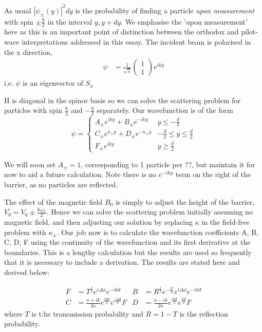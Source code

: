 \documentclass{article}
\begin{document}
As usual $|\psi_{\pm}(y)|^{2}dy$ is the probability of finding a particle \textit{upon measurement} with spin $\pm \frac{\hbar}{2}$ in the interval $y, y+dy$. We emphasise the 'upon measurement' here as this is an important point of distinction between the orthodox and pilot-wave interpretations addressed in this essay. The incident beam is polarised in the x direction,
\begin{align}
	\psi &= \frac{1}{\sqrt{2}}
	\begin{pmatrix}
	1\\
	1
	\end{pmatrix}
	e^{i k y}
\end{align}
i.e. $\psi$ is an eigenvector of $S_{x}$

H is diagonal in the spinor basis so we can solve the scattering problem for particles with spin $\frac{\hbar}{2}$ and $-\frac{\hbar}{2}$ separately. 
Our wavefunction is of the form
\begin{equation}
	\psi = 
	\begin{cases}
		A_{\pm}e^{i k y} + B_{\pm}e^{-i k y} & y \leq -\frac{d}{2} \\
		C_{\pm}e^{\kappa_{\pm}y} + D_{\pm}e^{-\kappa_{\pm}y} & -\frac{d}{2} \leq y \leq \frac{d}{2} \\
		F_{\pm}e^{i k y} & y \geq \frac{d}{2}
	\end{cases}
\end{equation}

We will soon set $A_{\pm} = 1$, corresponding to 1 particle per ??, but maintain it for now to aid a future calculation. Note there is no $e^{-i k y}$ term on the right of the barrier, as no particles are reflected. 

The effect of the magnetic field $B_0$ is simply to adjust the height of the barrier, $V_0^{'} = V_0 \pm \frac{\hbar \omega_L}{2}$. Hence we can solve the scattering problem initially assuming no magnetic field, and then adjusting our solution by replacing $\kappa$ in the field-free problem with $\kappa_{\pm}$. Our job now is to calculate the wavefunction coefficients A, B, C, D, F using the continuity of the wavefunction and its first derivative at the boundaries.
This is a lengthy calculation but the results are used so frequently that it is necessary to include a derivation. The results are stated here and derived below:

\begin{align}
	F &= T^{\frac{1}{2}}e^{i\Delta\phi}e^{-ikd} & B &= R^{\frac{1}{2}}e^{-\frac{i\pi}{2}}e^{i\Delta\phi}e^{-ikd} \nonumber \\
	C &= \frac{\kappa+ik}{2\kappa}e^{\frac{ikd}{2}}e^{\frac{-\kappa d}{2}}F & D &= \frac{\kappa-ik}{2\kappa}e^{\frac{ikd}{2}}e^{\frac{\kappa d}{2}}F
\end{align}
where $T$ is t:he transmission probability and $R = 1-T$ is the reflection probability.
\end{document}
